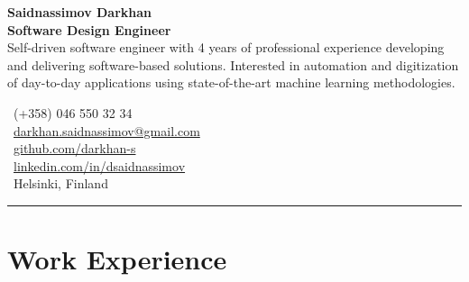 \documentclass[a4paper,10pt]{article}
\begin{document}

\noindent
\begin{minipage}[t]{0.65\textwidth} %
    {\color{darkblue}\textbf{\LARGE Saidnassimov Darkhan}} \\[0.2cm]
    \textbf{\large Software Design Engineer} \\[0.2cm]
    Self-driven software engineer with 4 years of professional experience developing and delivering software-based solutions. Interested in automation and digitization of day-to-day applications using state-of-the-art machine learning methodologies.
\end{minipage}
\hfill
\begin{minipage}[t]{0.32\textwidth} %
    \vspace{0pt} %
    \faPhone\ (+358) 046 550 32 34 \\[0.2cm]
    \faEnvelope\ \href{mailto:darkhan.saidnassimov@gmail.com}{\mbox{darkhan.saidnassimov@gmail.com}} \\[0.2cm]
    \faGithub\ \href{https://github.com/darkhan-s}{\mbox{github.com/darkhan-s}} \\[0.2cm]
    \faLinkedin\ \href{https://www.linkedin.com/in/dsaidnassimov/}{\mbox{linkedin.com/in/dsaidnassimov}} \\[0.2cm]
    \faMapMarker\ Helsinki, Finland
\end{minipage}



\vspace{0.2cm}
\hrule
\vspace{0.1cm}

\section*{Work Experience}
\end{document}
